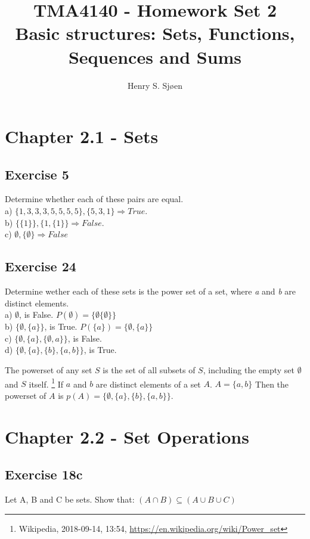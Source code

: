 \documentclass[12pt]{article}
\author{Henry S. Sjøen}
\title{%
  \textbf{TMA4140 - Homework Set 2}\\
  Basic structures: Sets, Functions, Sequences and Sums\\
    \color{darkred}{\textbf{RETTES}}
  }
\begin{document}
    \maketitle 
    \thispagestyle{empty}
    \tableofcontents
      
    \pagebreak
    \section{Chapter 2.1 - Sets}
    \subsection{Exercise 5}
    Determine whether each of these pairs are equal.\\
        a) $\{1,3,3,3,5,5,5,5\},\{5,3,1\} \Rightarrow True$.\\
        b) $\{\{1\}\},\{1,\{1\}\} \Rightarrow False.$\\
        c) $\emptyset,\{\emptyset\} \Rightarrow False$
   
    \subsection{Exercise 24}
    Determine wether each of these sets is the power set of a set, where \emph{a} and \emph{b} are distinct elements.\\
        a) $\emptyset$, is False. $P(\emptyset)=\{\emptyset\{\emptyset\}\}$\\ 
        b) $\{\emptyset,\{a\}\}$, is True. $P(\{a\})=\{\emptyset,\{a\}\}$\\
        c) $\{\emptyset, \{a\},\{\emptyset,a\}\}$, is False.\\
        d) $\{\emptyset,\{a\},\{b\},\{a,b\}\}$, is True.

        The powerset of any set $S$ is the set of all subsets of $S$, including the empty set $\emptyset$ and $S$ itself. \footnote{Wikipedia, 2018-09-14, 13:54, \url{https://en.wikipedia.org/wiki/Power_set}}
        If $a$ and $b$ are distinct elements of a set $A$. $A=\{a,b\}$
        Then the powerset of $A$ is $p(A)=\{\emptyset,\{a\},\{b\},\{a,b\}\}$.

    \pagebreak
    \section{Chapter 2.2 - Set Operations}
    \subsection{Exercise 18c}
    Let A, B and C be sets. Show that:
    $(A \cap B) \subseteq (A \cup B \cup C)$
    
\end{document}

